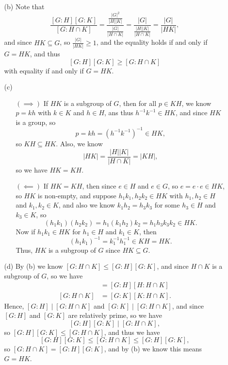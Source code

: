 \documentclass[a4paper,12pt]{article}
\begin{document}
\begin{enumerate}
\begin{itemize}
\[        \]  
        \item [(b)] Note that 
        \[
            \frac{[G:H][G:K]}{[G: H \cap K]} = \frac{\frac{\vert G \vert^2 }{\vert H \vert \vert K \vert }}{\frac{\vert G \vert }{\vert H \cap K \vert }} = \frac{\vert G \vert }{\frac{\vert H \vert \vert K \vert  }{\vert H \cap K \vert }} = \frac{\vert G \vert }{\vert H K \vert },
        \]
        and since \(HK \subseteq G\), so \(\frac{\vert G \vert }{\vert HK \vert }\ge 1 \), and the equality holds if and only if \(G = HK\), and thus
        \[
            [G:H] [G:K] \ge [G: H \cap K]
        \] with equality if and only if \(G = HK\). 
        \item [(c)] \vphantom{text}
        \begin{itemize}
            \item [\((\implies )\)] If \(HK\) is a subgroup of \(G\), then for all \(p \in KH\), we know \(p = kh\) with \(k \in K\) and \(h \in H\), ans thus \(h^{-1} k^{-1} \in HK\), and since \(HK\) is a group, so
            \[
                p = kh = \left( h^{-1} k^{-1} \right)^{-1} \in HK,
            \] so \(KH \subseteq HK\). Also, we know 
            \[
                \vert HK \vert = \frac{\vert H \vert \vert K \vert }{\vert H \cap K \vert } = \vert KH \vert, 
            \] so we have \(HK = KH\). 
            \item [\((\impliedby )\)] If \(HK = KH\), then since \(e \in H\) and \(e \in G\), so \(e = e \cdot e \in HK\), so \(HK\) is non-empty, and suppose \(h_1 k_1, h_2 k_2 \in HK\) with \(h_1, h_2 \in H\) and \(k_1, k_2 \in K\), and also we know \(k_1 h_2 = h_3 k_3\) for some \(h_3 \in H\) and \(k_3 \in K\), so 
            \[
                (h_1 k_1) (h_2 k_2) = h_1 (k_1 h_2) k_2 = h_1 h_3 k_3 k_2 \in HK.
            \] Now if \(h_1 k_1 \in HK\) for \(h_1 \in H\) and \(k_1 \in K\), then 
            \[
                \left( h_1 k_1 \right)^{-1} = k_1^{-1} h_1^{-1} \in KH = HK.
            \]   Thus, \(HK\) is a subgroup of \(G\) since \(HK \subseteq G\).  
        \end{itemize}
        \item [(d)] By (b) we know \([G: H \cap K] \le [G: H] [G: K]\), and since \(H \cap K\) is a subgroup of \(G\), so we have  
        \begin{align*}
            [G: H \cap K] &= [G: H] [H: H \cap K] \\
            [G: H \cap K] &= [G: K] [K : H \cap K].
        \end{align*} 
        Hence, \([G: H] \mid [G: H \cap K]\) and \([G:K] \mid [G: H \cap K]\), and since \([G:H]\) and \([G:K]\) are relatively prime, so we have 
        \[
            [G:H] [G:K] \mid [G: H \cap K],
        \] so \([G: H] [G:K] \le [G: H \cap K]\), and thus we have 
        \[
            [G: H] [G:K] \le [G: H \cap K] \le [G:H] [G:K],
        \] so \([G:H \cap K] = [G:H] [G:K]\), and by (b) we know this means \(G = HK\).  
    \end{itemize}


\end{enumerate}
\end{document}
